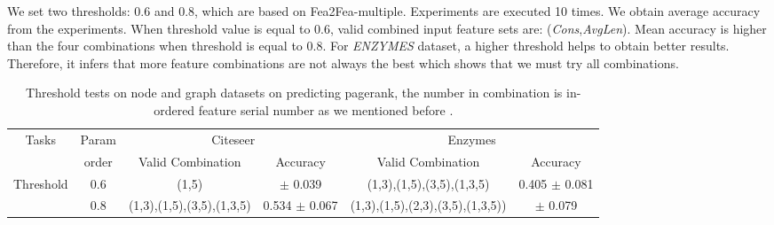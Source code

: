 \documentclass[runningheads]{llncs}
\newcommand{\B}{\fontseries{b}\selectfont}
\begin{document}
    \vspace{-1.2cm}
    We set two thresholds: 0.6 and 0.8, which are based on Fea2Fea-multiple. Experiments are executed 10 times. We obtain average accuracy from the experiments. When threshold value is equal to 0.6, valid combined input feature sets are: (\textit{Cons},\textit{AvgLen}). Mean accuracy is higher than the four combinations when threshold is equal to 0.8. For \textit{ENZYMES} dataset, a higher threshold helps to obtain better results. Therefore, it infers that more feature combinations are not always the best which shows that we must try all combinations.
    \vspace{-0.8cm}
     \begin{center}
      \begin{table}[!htp]\scriptsize
        \centering
        \caption{Threshold tests on node and graph datasets on predicting pagerank, the number in 
combination is in-ordered feature serial number as we mentioned before .}
        \label{tab:commands}
        \begin{tabular}{*{6}{c}} \toprule
      {Tasks} & Param  & \multicolumn{2}{c}{{\sc Citeseer}} & \multicolumn{2}{c}{{\sc Enzymes}} \\
      \cmidrule(lr){3-4}\cmidrule(lr){5-6}
      & order  & Valid Combination & Accuracy  & Valid Combination & Accuracy  \\ \hline
      
      \multirow{2}{4em}{Threshold} 
      &0.6 & (1,5)&  \B0.611 $\pm$ 0.039 & (1,3),(1,5),(3,5),(1,3,5) & 0.405 $\pm$ 0.081 \\
      &0.8 & (1,3),(1,5),(3,5),(1,3,5)&  0.534 $\pm$ 0.067 &(1,3),(1,5),(2,3),(3,5),(1,3,5)) & 
\B0.440 $\pm$ 0.079 \\
      \hline
      
      \bottomrule
        \end{tabular}
      \end{table}
      \end{center}
\vspace{-1cm}
\end{document}
